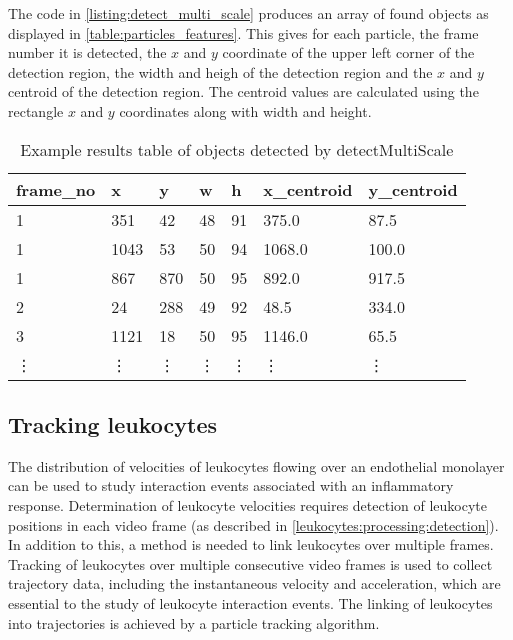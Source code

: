 The code in \autoref{listing:detect_multi_scale} produces an array of found objects as displayed in \autoref{table:particles_features}. This gives for each particle, the frame number it is detected, the $x$ and $y$ coordinate of the upper left corner of the detection region, the width and heigh of the detection region and the $x$ and $y$ centroid of the detection region. The centroid values are calculated using the rectangle $x$ and $y$ coordinates along with width and height.

\begin{table}[htbp]
\centering
\caption{Example results table of objects detected by detectMultiScale}
\begin{tabular}{lllllll}
\toprule
frame\_no & x      & y      & w      & h      & x\_centroid & y\_centroid \\
\midrule
1         & 351    & 42     & 48     & 91     & 375.0       & 87.5        \\
1         & 1043   & 53     & 50     & 94     & 1068.0      & 100.0       \\
1         & 867    & 870    & 50     & 95     & 892.0       & 917.5       \\
2         & 24     & 288    & 49     & 92     & 48.5        & 334.0       \\
3         & 1121   & 18     & 50     & 95     & 1146.0      & 65.5        \\
\vdots    & \vdots & \vdots & \vdots & \vdots & \vdots      & \vdots      \\
\bottomrule
\end{tabular}
\label{table:particles_features}
\end{table}

\subsection{Tracking leukocytes}
\label{leukocytes:processing:tracking}
The distribution of velocities of leukocytes flowing over an endothelial monolayer can be used to study interaction events associated with an inflammatory response. Determination of leukocyte velocities requires detection of leukocyte positions in each video frame (as described in \autoref{leukocytes:processing:detection}). In addition to this, a method is needed to link leukocytes over multiple frames. Tracking of leukocytes over multiple consecutive video frames is used to collect trajectory data, including the instantaneous velocity and acceleration, which are essential to the study of leukocyte interaction events. The linking of leukocytes into trajectories is achieved by a particle tracking algorithm.


